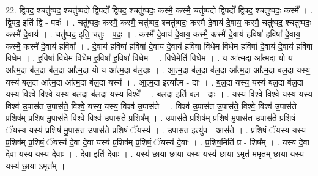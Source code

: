 \documentclass[17pt]{extarticle}
\begin{document}
22. द्वि॒पद॒ श्चतु॑ष्पद॒ श्चतु॑ष्पदो द्वि॒पदो᳚ द्वि॒पद॒ श्चतु॑ष्पदः॒ कस्मै॒ कस्मै॒ चतु॑ष्पदो द्वि॒पदो᳚ द्वि॒पद॒ श्चतु॑ष्पदः॒ कस्मै᳚ । . द्वि॒पद॒ इति॑ द्वि - पदः॑ । . चतु॑ष्पदः॒ कस्मै॒ कस्मै॒ चतु॑ष्पद॒ श्चतु॑ष्पदः॒ कस्मै॑ दे॒वाय॑ दे॒वाय॒ कस्मै॒ चतु॑ष्पद॒ श्चतु॑ष्पदः॒ कस्मै॑ दे॒वाय॑ । . चतु॑ष्पद॒ इति॒ चतुः॑ - प॒दः॒ । . कस्मै॑ दे॒वाय॑ दे॒वाय॒ कस्मै॒ कस्मै॑ दे॒वाय॑ ह॒विषा॑ ह॒विषा॑ दे॒वाय॒ कस्मै॒ कस्मै॑ दे॒वाय॑ ह॒विषा᳚ । . दे॒वाय॑ ह॒विषा॑ ह॒विषा॑ दे॒वाय॑ दे॒वाय॑ ह॒विषा॑ विधेम विधेम ह॒विषा॑ दे॒वाय॑ दे॒वाय॑ ह॒विषा॑ विधेम । . ह॒विषा॑ विधेम विधेम ह॒विषा॑ ह॒विषा॑ विधेम । . वि॒धे॒मेति॑ विधेम । . य आ᳚त्म॒दा आ᳚त्म॒दा यो य आ᳚त्म॒दा ब॑ल॒दा ब॑ल॒दा आ᳚त्म॒दा यो य आ᳚त्म॒दा ब॑ल॒दाः । . आ॒त्म॒दा ब॑ल॒दा ब॑ल॒दा आ᳚त्म॒दा आ᳚त्म॒दा ब॑ल॒दा यस्य॒ यस्य॑ बल॒दा आ᳚त्म॒दा आ᳚त्म॒दा ब॑ल॒दा यस्य॑ । . आ॒त्म॒दा इत्या᳚त्म - दाः । . ब॒ल॒दा यस्य॒ यस्य॑ बल॒दा ब॑ल॒दा यस्य॒ विश्वे॒ विश्वे॒ यस्य॑ बल॒दा ब॑ल॒दा यस्य॒ विश्वे᳚ । . ब॒ल॒दा इति॑ बल - दाः । . यस्य॒ विश्वे॒ विश्वे॒ यस्य॒ यस्य॒ विश्व॑ उ॒पास॑त उ॒पास॑ते॒ विश्वे॒ यस्य॒ यस्य॒ विश्व॑ उ॒पास॑ते । . विश्व॑ उ॒पास॑त उ॒पास॑ते॒ विश्वे॒ विश्व॑ उ॒पास॑ते प्र॒शिष॑म् प्र॒शिष॑ मु॒पास॑ते॒ विश्वे॒ विश्व॑ उ॒पास॑ते प्र॒शिष᳚म् । . उ॒पास॑ते प्र॒शिष॑म् प्र॒शिष॑ मु॒पास॑त उ॒पास॑ते प्र॒शिषं॒ ॅयस्य॒ यस्य॑ प्र॒शिष॑ मु॒पास॑त उ॒पास॑ते प्र॒शिषं॒ ॅयस्य॑ । . उ॒पास॑त॒ इत्यु॑प - आस॑ते । . प्र॒शिषं॒ ॅयस्य॒ यस्य॑ प्र॒शिष॑म् प्र॒शिषं॒ ॅयस्य॑ दे॒वा दे॒वा यस्य॑ प्र॒शिष॑म् प्र॒शिषं॒ ॅयस्य॑ दे॒वाः । . प्र॒शिष॒मिति॑ प्र - शिष᳚म् । . यस्य॑ दे॒वा दे॒वा यस्य॒ यस्य॑ दे॒वाः । . दे॒वा इति॑ दे॒वाः । . यस्य॑ छा॒या छा॒या यस्य॒ यस्य॑ छा॒या ऽमृत॑ म॒मृत॑म् छा॒या यस्य॒ यस्य॑ छा॒या ऽमृत᳚म् । \newline
\end{document}
